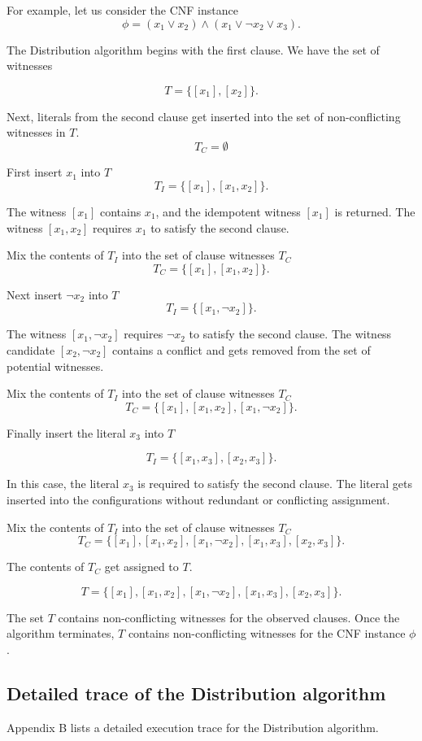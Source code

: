 For example, let us consider the CNF instance
\[
\phi = (x_1 \vee x_2) \wedge (x_1 \vee \neg x_2 \vee x_3).
\]		

The Distribution algorithm begins with the first clause.  We have the set of witnesses

\[
T = \{ [x_1], [x_2] \}.
\] 

Next, literals from the second clause get inserted into the set of non-conflicting witnesses in $T$.
\[
T_C = \emptyset
\]

\noindent First insert $x_1$ into $T$
\[
T_I = \{ [x_1], [x_1, x_2] \}.
\] 

\noindent The witness $[x_1]$ contains $x_1$, and the idempotent witness $[x_1]$ is returned.  The witness $[x_1, x_2]$ requires $x_1$ to satisfy the second clause.

Mix the contents of $T_I$ into the set of clause witnesses $T_C$
\[
T_C = \{ [x_1], [x_1, x_2] \}.
\]

\noindent Next insert $\neg x_2$ into $T$
\[
T_I = \{ [x_1, \neg x_2] \}.
\] 

\noindent The witness $[x_1, \neg x_2]$ requires $\neg x_2$ to satisfy the second clause.  The witness candidate $[x_2, \neg x_2]$ contains a conflict and gets removed from the set of potential witnesses.

Mix the contents of $T_I$ into the set of clause witnesses $T_C$
\[
T_C = \{ [x_1], [x_1, x_2], [x_1, \neg x_2] \}.
\]


Finally insert the literal $x_3$ into $T$

\[
T_I = \{ [x_1, x_3], [x_2, x_3] \}.
\] 

\noindent In this case, the literal $x_3$ is required to satisfy the second clause.  The literal gets inserted into the configurations without redundant or conflicting assignment.

Mix the contents of $T_I$ into the set of clause witnesses $T_C$
\[
T_C = \{ [x_1], [x_1, x_2], [x_1, \neg x_2], [x_1, x_3], [x_2, x_3] \}.
\]

The contents of $T_C$ get assigned to $T$.

\[
T = \{ [x_1], [x_1, x_2], [x_1, \neg x_2], [x_1, x_3], [x_2, x_3] \}.
\]

The set $T$ contains non-conflicting witnesses for the observed clauses.  Once the algorithm terminates, $T$ contains non-conflicting witnesses for the CNF instance $\phi$. 
	
	\subsection{Detailed trace of the Distribution algorithm}

Appendix B lists a detailed execution trace for the Distribution algorithm.


%
%
%	


